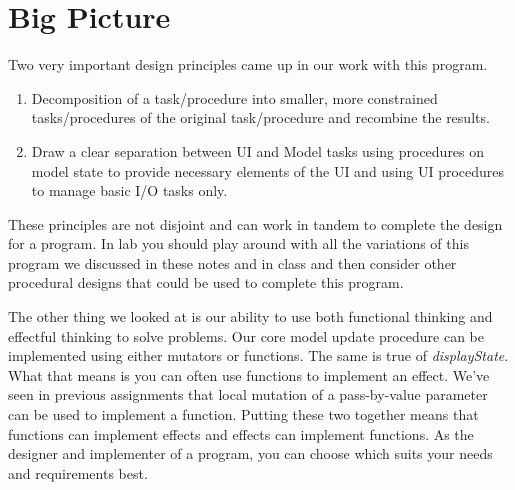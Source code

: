 \documentclass[nobib]{tufte-handout}
\begin{document}
\section{Big Picture}

Two very important design principles came up in our work with this program.
\begin{enumerate}
\item Decomposition of a task/procedure into smaller, more constrained tasks/procedures of the original task/procedure and recombine the results.
\item Draw a clear separation between UI and Model tasks using procedures on model state to provide necessary elements of the UI and using UI procedures to manage basic I/O tasks only.
\end{enumerate}
These principles are not disjoint and can work in tandem to complete the design for a program. In lab you should play around with all the variations of this program we discussed in these notes and in class and then consider other procedural designs that could be used to complete this program.

The other thing we looked at is our ability to use both functional thinking and effectful thinking to solve problems. Our core model update procedure can be implemented using either mutators or functions. The same is true of \textit{displayState}.  What that means is you can often use functions to implement an effect. We've seen in previous assignments that local mutation of a pass-by-value parameter can be used to implement a function. Putting these two together means that functions can implement effects and effects can implement functions. As the designer and implementer of a program, you can choose which suits your needs and requirements best.
\end{document}
